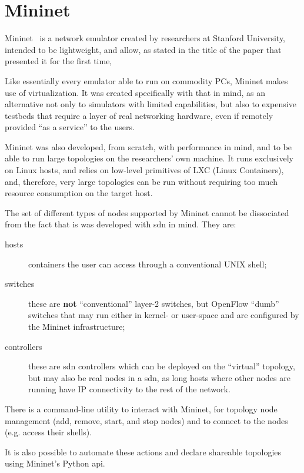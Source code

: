 \section{Mininet}
\label{sec:exemulmininet}

Mininet~\cite{mininetnetworklaptop} is a network emulator created by researchers at Stanford University, intended to be lightweight, and allow, as stated in the title of the paper that presented it for the first time, 

Like essentially every emulator able to run on commodity PCs, Mininet makes use of virtualization.
It was created specifically with that in mind, as an alternative not only to simulators with limited capabilities, but also to expensive testbeds that require a layer of real networking hardware, even if remotely provided ``as a service'' to the users.

Mininet was also developed, from scratch, with performance in mind, and to be able to run large topologies on the researchers' own machine.
It runs exclusively on Linux hosts, and relies on low-level primitives of LXC (Linux Containers), and, therefore, very large topologies can be run without requiring too much resource consumption on the target host.

The set of different types of nodes supported by Mininet cannot be dissociated from the fact that is was developed with \gls{sdn} in mind.
They are:
\begin{description}
  \item[hosts] containers the user can access through a conventional UNIX shell;
  \item[switches] these are \textbf{not} ``conventional'' layer-2 switches, but OpenFlow ``dumb'' switches that may run either in kernel- or user-space and are configured by the Mininet infrastructure;
  \item[controllers] these are \gls{sdn} controllers which can be deployed on the ``virtual'' topology, but may also be real nodes in a \gls{sdn}, as long hosts where other nodes are running have IP connectivity to the rest of the network.
\end{description}

There is a command-line utility to interact with Mininet, for topology node management (add, remove, start, and stop nodes) and to connect to the nodes (e.g. access their shells).

It is also possible to automate these actions and declare shareable topologies using Mininet's Python \gls{api}.

